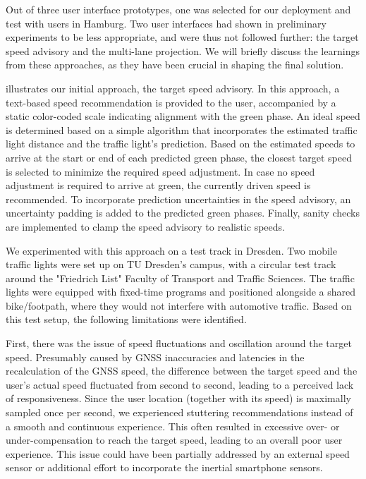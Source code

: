 Out of three user interface prototypes, one was selected for our deployment and test with users in Hamburg. Two user interfaces had shown in preliminary experiments to be less appropriate, and were thus not followed further: the target speed advisory and the multi-lane projection. We will briefly discuss the learnings from these approaches, as they have been crucial in shaping the final solution.

 illustrates our initial approach, the target speed advisory. In this approach, a text-based speed recommendation is provided to the user, accompanied by a static color-coded scale indicating alignment with the green phase. An ideal speed is determined based on a simple algorithm that incorporates the estimated traffic light distance and the traffic light's prediction. Based on the estimated speeds to arrive at the start or end of each predicted green phase, the closest target speed is selected to minimize the required speed adjustment. In case no speed adjustment is required to arrive at green, the currently driven speed is recommended. To incorporate prediction uncertainties in the speed advisory, an uncertainty padding is added to the predicted green phases. Finally, sanity checks are implemented to clamp the speed advisory to realistic speeds.

We experimented with this approach on a test track in Dresden. Two mobile traffic lights were set up on TU Dresden's campus, with a circular test track around the "Friedrich List" Faculty of Transport and Traffic Sciences. The traffic lights were equipped with fixed-time programs and positioned alongside a shared bike/footpath, where they would not interfere with automotive traffic. Based on this test setup, the following limitations were identified.

First, there was the issue of speed fluctuations and oscillation around the target speed. Presumably caused by GNSS inaccuracies and latencies in the recalculation of the GNSS speed, the difference between the target speed and the user's actual speed fluctuated from second to second, leading to a perceived lack of responsiveness. Since the user location (together with its speed) is maximally sampled once per second, we experienced stuttering recommendations instead of a smooth and continuous experience. This often resulted in excessive over- or under-compensation to reach the target speed, leading to an overall poor user experience. This issue could have been partially addressed by an external speed sensor or additional effort to incorporate the inertial smartphone sensors.

